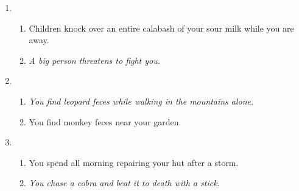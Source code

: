 \documentclass[idxtotoc,hyperref,openany]{labbook} %
\begin{document}
\begin{enumerate}
\item \begin{enumerate} 
\item  Children knock over an entire calabash of your sour milk while you are away.
\item   \emph{A big person threatens to fight you.}
\end{enumerate}

\item \begin{enumerate} 
\item  \emph{You find leopard feces while walking in the mountains alone.}
\item   You find monkey feces near your garden.
\end{enumerate}

\item \begin{enumerate} 
\item  You spend all morning repairing your hut after a storm.
\item   \emph{You chase a cobra and beat it to death with a stick.}
\end{enumerate}
\end{enumerate}

\end{document}
